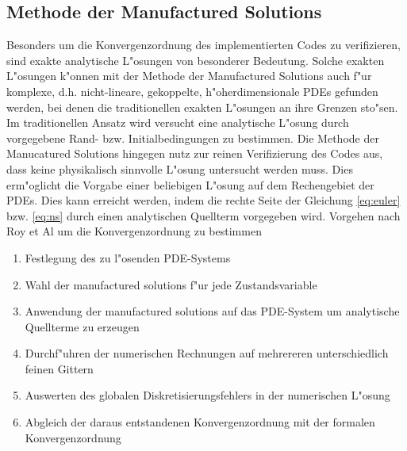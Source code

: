 \subsection{Methode der Manufactured Solutions}
Besonders um die Konvergenzordnung des implementierten Codes zu verifizieren, sind exakte analytische L"osungen von besonderer Bedeutung. Solche exakten L"osungen k"onnen mit der Methode der Manufactured Solutions auch f"ur komplexe, d.h. nicht-lineare, gekoppelte, h"oherdimensionale PDEs gefunden werden, bei denen die traditionellen exakten L"osungen an ihre Grenzen sto"sen. Im traditionellen Ansatz wird versucht eine analytische L"osung durch vorgegebene Rand- bzw. Initialbedingungen zu bestimmen. Die Methode der Manucatured Solutions hingegen nutz zur reinen Verifizierung des Codes aus, dass keine physikalisch sinnvolle L"osung untersucht werden muss. Dies erm"oglicht die Vorgabe einer beliebigen L"osung auf dem Rechengebiet der PDEs. Dies kann erreicht werden, indem die rechte Seite der Gleichung \ref{eq:euler} bzw. \ref{eq:ns} durch einen analytischen Quellterm vorgegeben wird.
Vorgehen nach Roy et Al \cite{roy} um die Konvergenzordnung zu bestimmen
\begin{enumerate}
	\item Festlegung des zu l"osenden PDE-Systems
	\item Wahl der manufactured solutions f"ur jede Zustandsvariable
	\item Anwendung der manufactured solutions auf das PDE-System um analytische Quellterme zu erzeugen
	\item Durchf"uhren der numerischen Rechnungen auf mehrereren unterschiedlich feinen Gittern
	\item Auswerten des globalen Diskretisierungsfehlers in der numerischen L"osung
	\item Abgleich der daraus entstandenen Konvergenzordnung mit der formalen Konvergenzordnung
\end{enumerate}

